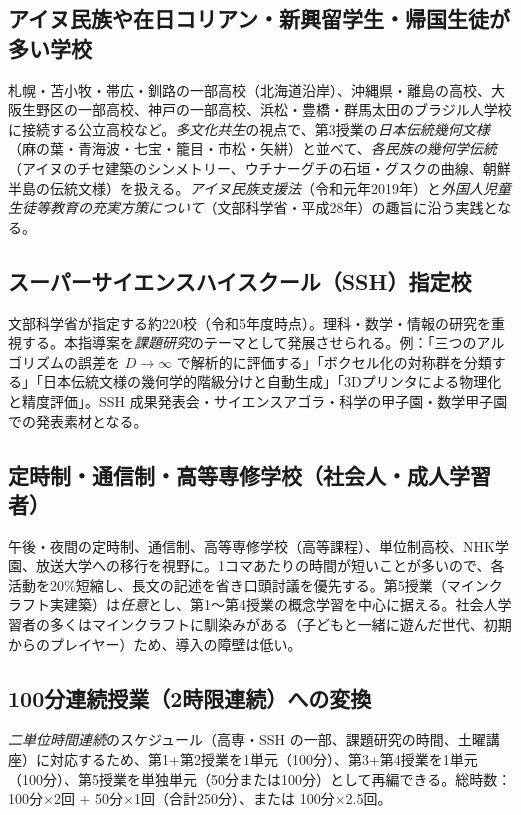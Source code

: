 \documentclass[12pt,a4paper]{scrartcl}
\begin{document}
\subsection{アイヌ民族や在日コリアン・新興留学生・帰国生徒が多い学校}
札幌・苫小牧・帯広・釧路の一部高校（北海道沿岸）、沖縄県・離島の高校、大阪生野区の一部高校、神戸の一部高校、浜松・豊橋・群馬太田のブラジル人学校に接続する公立高校など。\emph{多文化共生}の視点で、第3授業の\emph{日本伝統幾何文様}（麻の葉・青海波・七宝・籠目・市松・矢絣）と並べて、\emph{各民族の幾何学伝統}（アイヌのチセ建築のシンメトリー、ウチナーグチの石垣・グスクの曲線、朝鮮半島の伝統文様）を扱える。\emph{アイヌ民族支援法}（令和元年2019年）と\emph{外国人児童生徒等教育の充実方策について}（文部科学省・平成28年）の趣旨に沿う実践となる。

\subsection{スーパーサイエンスハイスクール（SSH）指定校}
文部科学省が指定する約220校（令和5年度時点）。理科・数学・情報の研究を重視する。本指導案を\emph{課題研究}のテーマとして発展させられる。例：「三つのアルゴリズムの誤差を $D \to \infty$ で解析的に評価する」「ボクセル化の対称群を分類する」「日本伝統文様の幾何学的階級分けと自動生成」「3Dプリンタによる物理化と精度評価」。SSH 成果発表会・サイエンスアゴラ・科学の甲子園・数学甲子園での発表素材となる。

\subsection{定時制・通信制・高等専修学校（社会人・成人学習者）}
午後・夜間の定時制、通信制、高等専修学校（高等課程）、単位制高校、NHK学園、放送大学への移行を視野に。1コマあたりの時間が短いことが多いので、各活動を20\%短縮し、長文の記述を省き口頭討議を優先する。第5授業（マインクラフト実建築）は\emph{任意}とし、第1〜第4授業の概念学習を中心に据える。社会人学習者の多くはマインクラフトに馴染みがある（子どもと一緒に遊んだ世代、初期からのプレイヤー）ため、導入の障壁は低い。

\subsection{100分連続授業（2時限連続）への変換}
\emph{二単位時間連続}のスケジュール（高専・SSH の一部、課題研究の時間、土曜講座）に対応するため、第1+第2授業を1単元（100分）、第3+第4授業を1単元（100分）、第5授業を単独単元（50分または100分）として再編できる。総時数：100分×2回 + 50分×1回（合計250分）、または 100分×2.5回。
\end{document}
